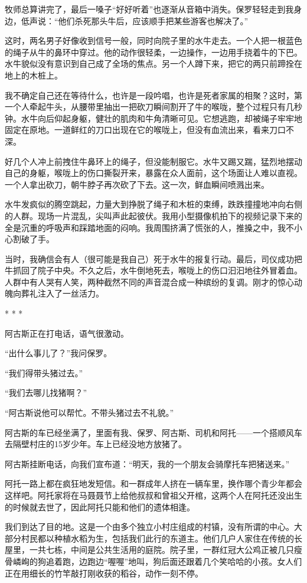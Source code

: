 \documentclass[12pt,oneside]{book}
\begin{document}
牧师总算讲完了，最后一嗓子“好好听着”也逐渐从音箱中消失。保罗轻轻走到我身边，低声说：“他们杀死那头牛后，应该顺手把某些游客也解决了。”

这时，两名男子好像收到信号一般，同时向院子里的水牛走去。一个人把一根蓝色的绳子从牛的鼻环中穿过。他的动作很轻柔，一边操作，一边用手挠着牛的下巴。水牛貌似没有意识到自己成了全场的焦点。另一个人蹲下来，把它的两只前蹄拴在地上的木桩上。

我不确定自己还在等待什么，也许是一段吟唱，也许是死者家属的相聚？这时，第一个人牵起牛头，从腰带里抽出一把砍刀瞬间割开了牛的喉咙，整个过程只有几秒钟。水牛向后仰起身躯，健壮的肌肉和牛角清晰可见。它想逃跑，却被绳子牢牢地固定在原地。一道鲜红的刀口出现在它的喉咙上，但没有血流出来，看来刀口不深。

好几个人冲上前拽住牛鼻环上的绳子，但没能制服它。水牛又踢又踹，猛烈地摆动自己的身躯，喉咙上的伤口撕裂开来，暴露在众人面前，这个场面让人难以直视。一个人拿出砍刀，朝牛脖子再次砍了下去。这一次，鲜血瞬间喷溅出来。

水牛发疯似的腾空跳起，力量大到挣脱了绳子和木桩的束缚，跌跌撞撞地冲向右侧的人群。现场一片混乱，尖叫声此起彼伏。我用小型摄像机拍下的视频记录下来的全是沉重的呼吸声和踩踏地面的闷响。我周围挤满了慌张的人，推搡之中，我不小心割破了手。

当时，我确信会有人（很可能是我自己）死于水牛的报复行动。最后，司仪成功把牛抓回了院子中央。不久之后，水牛倒地死去，喉咙上的伤口汩汩地往外冒着血。人群中有人哭有人笑，两种截然不同的声音混合成一种缤纷的复调。刚才的惊心动魄向葬礼注入了一丝活力。

\begin{center}
* * *
\end{center}

阿古斯正在打电话，语气很激动。

“出什么事儿了？”我问保罗。

“我们得带头猪过去。”

“我们去哪儿找猪啊？”

“阿古斯说他可以帮忙。不带头猪过去不礼貌。”

阿古斯的车已经坐满了，里面有我、保罗、阿古斯、司机和阿托——一个搭顺风车去隔壁村庄的15岁少年。车上已经没地方放猪了。

阿古斯挂断电话，向我们宣布道：“明天，我的一个朋友会骑摩托车把猪送来。”

阿托一路上都在疯狂地发短信。和一群成年人挤在一辆车里，换作哪个青少年都会这样吧。阿托家将在马聂聂节上给他叔叔和曾祖父开棺，这两个人在阿托还没出生的时候就去世了，因此阿托只能和他们的遗体相逢。

我们到达了目的地。这是一个由多个独立小村庄组成的村镇，没有所谓的中心。大部分村民都以种植水稻为生，包括我们此行的东道主。他们几户人家住在传统的长屋里，一共七栋，中间是公共生活用的庭院。院子里，一群红冠大公鸡正被几只瘦骨嶙峋的狗追着跑，边跑边“喔喔”地叫，狗后面还跟着几个笑哈哈的小孩。女人们正在用细长的竹竿敲打刚收获的稻谷，动作一刻不停。
\end{document}
